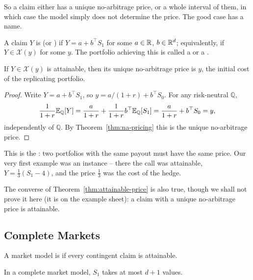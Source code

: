 \documentclass[a4paper]{scrartcl}
\newcommand{\QQ}{\mathbb{Q}}
\begin{document}
So a claim either has a unique no-arbitrage price, or a whole interval of them, in which case the model simply does not determine the price. The good case has a name.

\begin{definition}
	A claim $Y$ is  (or ) if $Y = a + b^\top S_1$ for some $a \in \mathbb{R}$, $b \in \mathbb{R}^d$; equivalently, if $Y \in \mathcal{X}(y)$ for some $y$. The portfolio achieving this is called a  or a .
\end{definition}

\begin{theorem}\label{thm:attainable-price}
	If $Y \in \mathcal{X}(y)$ is attainable, then its unique no-arbitrage price is $y$, the initial cost of the replicating portfolio.
\end{theorem}

\begin{proof}
	Write $Y = a + b^\top S_1$, so $y = a/(1+r) + b^\top S_0$. For any risk-neutral $\QQ$,
	$$
	\frac{1}{1+r}\EE_\QQ[Y] = \frac{a}{1+r} + \frac{1}{1+r}b^\top \EE_\QQ[S_1] = \frac{a}{1+r} + b^\top S_0 = y,
	$$
	independently of $\QQ$. By Theorem~\ref{thm:na-pricing} this is the unique no-arbitrage price.
\end{proof}

This is the : two portfolios with the same payout must have the same price. Our very first example was an instance -- there the call was attainable, $Y = \tfrac13(S_1 - 4)$, and the price $\tfrac13$ was the cost of the hedge.

The converse of Theorem~\ref{thm:attainable-price} is also true, though we shall not prove it here (it is on the example sheet): a claim with a unique no-arbitrage price is attainable.

\subsection{Complete Markets}

\begin{definition}
	A market model is  if every contingent claim is attainable.
\end{definition}

\begin{proposition}
	In a complete market model, $S_1$ takes at most $d+1$ values.
\end{proposition}
\end{document}
